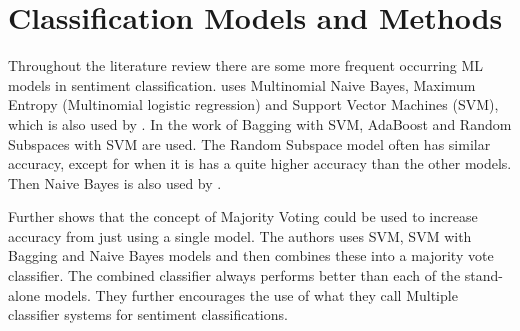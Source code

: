 \section{Classification Models and Methods}
\label{sec:classification-models}


Throughout the literature review there are some more frequent occurring ML models in sentiment classification. 
\cite{rui-xia} uses Multinomial Naive Bayes, Maximum Entropy (Multinomial logistic regression) and Support Vector Machines (SVM), which is also used by \cite{pang-bo}. 
In the work of \cite{gang-wang} Bagging with SVM, AdaBoost and Random Subspaces with SVM are used. 
The Random Subspace model often has similar accuracy, except for when it is has a quite higher accuracy than the other models. 
Then Naive Bayes is also used by \cite{pak}.


Further \cite{catal} shows that the concept of Majority Voting could be used to increase accuracy from just using a single model. 
The authors uses SVM, SVM with Bagging and Naive Bayes models and then combines these into a majority vote classifier. 
The combined classifier always performs better than each of the stand-alone models. 
They further encourages the use of what they call Multiple classifier systems for sentiment classifications.

